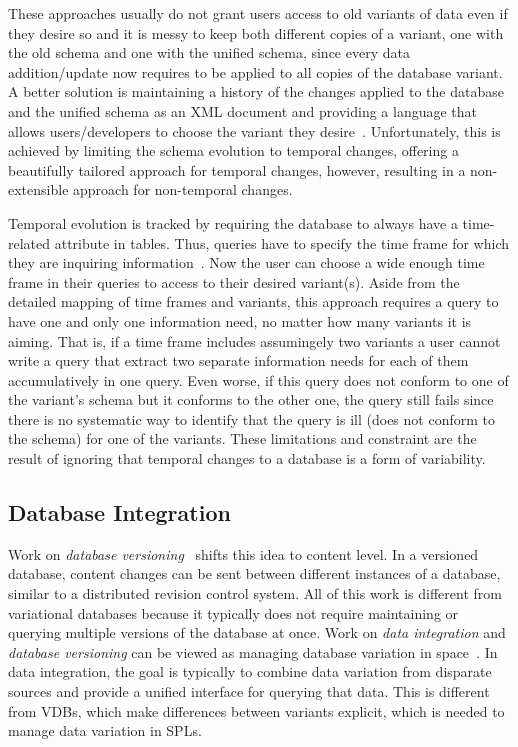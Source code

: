 These approaches usually do not
grant users access to old variants of data even if they desire so and it
is messy to keep both different copies of a variant, one with the old schema
and one with the unified schema, since every data addition/update now requires to 
be applied to all copies of the database variant. A better solution
is maintaining a history of the changes applied to the database and the unified schema
as an XML document and providing a language that allows users/developers to choose
the variant they desire~\cite{prima08Moon}. Unfortunately, this is achieved by limiting
the schema evolution to temporal changes, offering a beautifully tailored approach for 
temporal changes, however, resulting in a non-extensible approach for non-temporal changes.

Temporal evolution is tracked by requiring the database to always have a time-related 
attribute in tables. Thus, queries have to specify the time frame for which they are inquiring 
information~\cite{prima08Moon}. 
Now the user can choose a wide enough time frame in their queries to access 
to their desired variant(s). Aside from the detailed mapping of time frames and variants, this
approach requires a query to have one and only one information need, no matter how many
variants it is aiming. That is, if a time frame includes assumingely two variants a user cannot 
write a query that extract two separate information needs for each of them accumulatively 
in one query. Even worse, if this query does not conform to one of the variant's schema
but it conforms to the other one, the query still fails since there is no systematic way to 
identify that the query is ill (does not conform to the schema) for one of the variants. 
These limitations and constraint are the result of ignoring that temporal changes to a 
database is a form of variability.

\subsection{Database Integration}
\label{sec:db-intg}

Work on \emph{database versioning}~\cite{datasetVersioning,dbVersioning}
shifts this idea to content level. In a versioned database, 
content changes can be sent between different instances of a database,
similar to a distributed revision control system.
%
All of this work is different from variational databases because it typically
does not require maintaining or querying multiple versions of the database at
once.
%
Work on \emph{data integration} and \emph{database versioning} can be viewed as
managing database variation in space~\cite{dataIntegBook}. In data integration,
the goal is typically to combine data variation from disparate sources and
provide a unified interface for querying that data. This is different from
VDBs, which make differences between variants explicit, which is needed to
manage data variation in SPLs.

